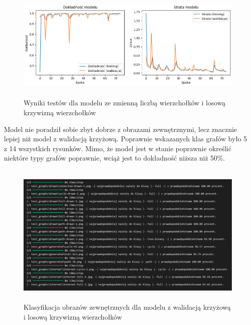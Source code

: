 \begin{figure}[ht]
	\centering
	\includegraphics[height=5.5cm]{resources/tests/images/v3/multiple_edges_img.png}
	\caption{Wyniki testów dla modelu ze zmienną liczbą wierzchołków i losową krzywizną wierzchołków}
	\label{Fig:tests-var-1}
\end{figure}
\FloatBarrier

Model nie poradził sobie zbyt dobrze z obrazami zewnętrznymi, lecz znacznie lepiej niż model z walidacją krzyżową.
Poprawnie wskazanych klas grafów było 5 z 14 wszystkich rysunków.
Mimo, że model jest w stanie poprawnie określić niektóre typy grafów poprawnie,
wciąż jest to dokładność niższa niż 50\%.

\begin{figure}[ht]
	\centering
	\includegraphics[height=7cm]{resources/tests/images/v3/multiple_edges_txt.png}
	\caption{Klasyfikacja obrazów zewnętrznych dla modelu z walidacją krzyżową i losową krzywizną wierzchołków}
	\label{Fig:tests-var-2}
\end{figure}
\FloatBarrier